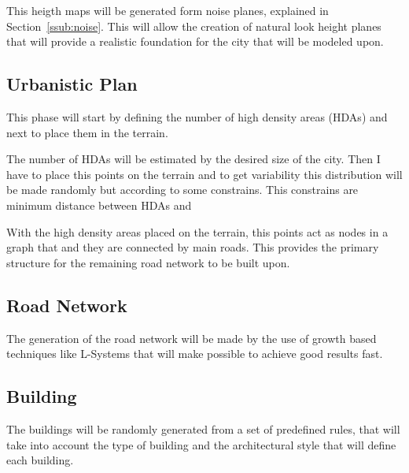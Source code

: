 This heigth maps will be generated form noise planes, explained in Section~\ref{ssub:noise}. This will allow the creation of natural look height planes that will provide a realistic foundation for the city that will be modeled upon.



\subsection{Urbanistic Plan} %
\label{sub:urbanistic_plan}
This phase will start by defining the number of high density areas (HDAs) and next to place them in the terrain. 

The number of HDAs will be estimated by the desired size of the city. Then I have to place this points on the terrain and to get variability this distribution will be made randomly but according to some constrains. This constrains are minimum distance between HDAs and 

With the high density areas placed on the terrain, this points act as nodes in a graph that and they are connected by main roads. This provides the primary structure for the remaining road network to be built upon.




\subsection{Road Network} %
\label{sub:road_network}
The generation of the road network will be made by the use of growth based techniques like L-Systems that will make possible to achieve good results fast.


\subsection{Building} %
\label{sub:building}
The buildings will be randomly generated from a set of predefined rules, that will take into account the type of building and the architectural style that will define each building.



